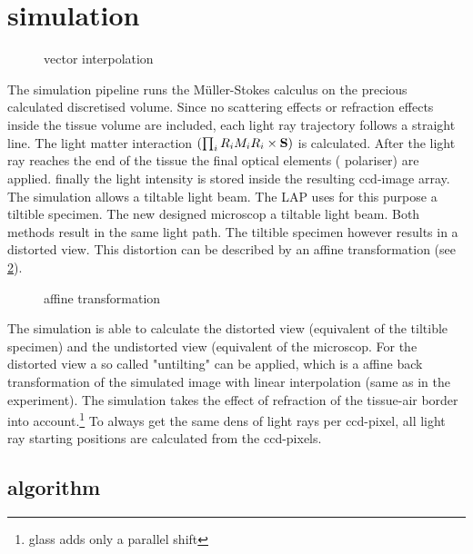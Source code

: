 \section{simulation}
\label{sec:simulation}
% 
\begin{figure}[!t]
\centering
\def\tikzwidth{0.42*\textwidth}
\caption{vector interpolation}
\label{fig:vectorfield_disc}
\end{figure}
% 
The simulation pipeline runs the M\"uller-Stokes calculus on the precious calculated discretised volume.
Since no scattering effects or refraction effects inside the tissue volume are included, each light ray trajectory follows a straight line.
The light matter interaction $\left( \prod_i R_i M_i R_i \times \mathbf{S} \right)$ is calculated. 
After the light ray reaches the end of the tissue the final optical elements (\eg{} polariser) are applied.
finally the light intensity is stored inside the resulting ccd-image array.\\
% 
The simulation allows a tiltable light beam.
The \ac{LAP} uses for this purpose a tiltible specimen.
The new designed microscop a tiltable light beam.
Both methods result in the same light path.
The tiltible specimen however results in a distorted view.
This distortion can be described by an affine transformation (see \cref{fig::affine_transformation}).
% 
\begin{figure}[!t]
\centering

\caption{affine transformation}
\label{fig::affine_transformation}
\end{figure}
% 
The simulation is able to calculate the distorted view (equivalent of the tiltible specimen) and the undistorted view (equivalent of the microscop. 
For the distorted view a so called "untilting" can be applied, which is a affine back transformation of the simulated image with linear interpolation (same as in the experiment).
% 
The simulation takes the effect of refraction of the tissue-air border into account.\footnote{glass adds only a parallel shift}
% 
To always get the same dens of light rays per ccd-pixel, all light ray starting positions are calculated from the ccd-pixels.
% 
\subsection{algorithm}
% 
